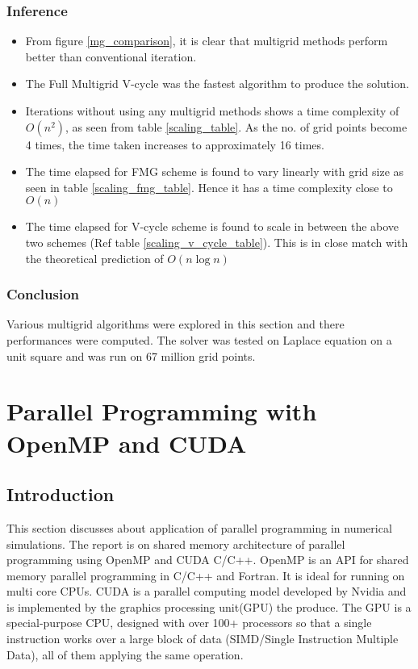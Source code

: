 \documentclass[a4paper]{report}
\begin{document}
	\subsection{Inference}
	\begin{itemize}
	\item From figure \ref{mg_comparison}, it is clear that multigrid methods perform better than conventional iteration.
	\item The Full Multigrid V-cycle was the fastest algorithm to produce the solution.
	\item Iterations without using any multigrid methods shows a time complexity of $O(n^2)$, as seen from table \ref{scaling_table}. As the no. of grid points become 4 times, the time taken increases to approximately 16 times.
	\item The time elapsed for FMG scheme is found to vary linearly with grid size as seen in table \ref{scaling_fmg_table}. Hence it has a time complexity close to $O(n)$
	\item The time elapsed for V-cycle scheme is found to scale in between the above two schemes (Ref table \ref{scaling_v_cycle_table}). This is in close match with the theoretical prediction of $O(n \log n)$ \cite{multigrid}
	\end{itemize}
	
	\subsection{Conclusion}
	Various multigrid algorithms were explored in this section and there performances were computed. The solver was tested on Laplace equation on a unit square and was run on 67 million grid points.
	
	
	\chapter{Parallel Programming with OpenMP and CUDA}

	\section{Introduction}
		This section discusses about application of parallel programming in numerical simulations. The report is on shared memory architecture of parallel programming using OpenMP and CUDA C/C++. OpenMP is an API for shared memory parallel programming in C/C++ and Fortran. It is ideal for running on multi core CPUs. CUDA is a parallel computing model developed by Nvidia and is implemented by the graphics processing unit(GPU) the produce.	The GPU is a special-purpose CPU, designed with over 100+ processors so that a single instruction works over a large block of data (SIMD/Single Instruction Multiple Data), all of them applying the same operation. 
	
\end{document}
